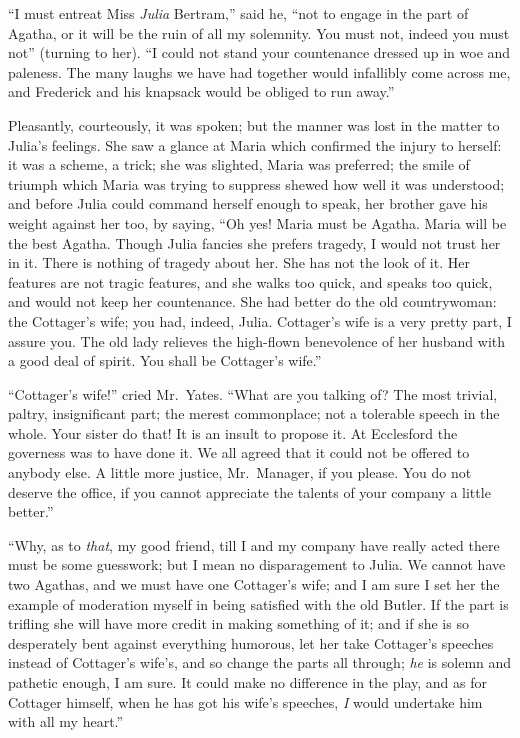 \documentclass{article}
\begin{document}
``I must entreat Miss \emph{Julia} Bertram,'' said he, ``not to
engage in the part of Agatha, or it will be the ruin
of all my solemnity.  You must not, indeed you must not''
(turning to her). ``I could not stand your countenance
dressed up in woe and paleness.  The many laughs we have
had together would infallibly come across me, and Frederick
and his knapsack would be obliged to run away.''

Pleasantly, courteously, it was spoken; but the
manner was lost in the matter to Julia's feelings.
She saw a glance at Maria which confirmed the injury
to herself:  it was a scheme, a trick; she was slighted,
Maria was preferred; the smile of triumph which Maria
was trying to suppress shewed how well it was understood;
and before Julia could command herself enough to speak,
her brother gave his weight against her too, by saying,
``Oh yes!  Maria must be Agatha.  Maria will be the
best Agatha.  Though Julia fancies she prefers tragedy,
I would not trust her in it.  There is nothing of tragedy
about her.  She has not the look of it.  Her features
are not tragic features, and she walks too quick,
and speaks too quick, and would not keep her countenance.
She had better do the old countrywoman:  the Cottager's wife;
you had, indeed, Julia.  Cottager's wife is a very pretty part,
I assure you.  The old lady relieves the high-flown
benevolence of her husband with a good deal of spirit.
You shall be Cottager's wife.''

``Cottager's wife!'' cried Mr.\ Yates.  ``What are you
talking of?  The most trivial, paltry, insignificant part;
the merest commonplace; not a tolerable speech in the whole.
Your sister do that!  It is an insult to propose it.
At Ecclesford the governess was to have done it.
We all agreed that it could not be offered to anybody else.
A little more justice, Mr.\ Manager, if you please.
You do not deserve the office, if you cannot appreciate
the talents of your company a little better.''

``Why, as to \emph{that}, my good friend, till I and my company
have really acted there must be some guesswork; but I mean
no disparagement to Julia.  We cannot have two Agathas,
and we must have one Cottager's wife; and I am sure I set
her the example of moderation myself in being satisfied
with the old Butler.  If the part is trifling she will
have more credit in making something of it; and if she
is so desperately bent against everything humorous,
let her take Cottager's speeches instead of Cottager's
wife's, and so change the parts all through; \emph{he} is
solemn and pathetic enough, I am sure.  It could make
no difference in the play, and as for Cottager himself,
when he has got his wife's speeches, \emph{I} would undertake
him with all my heart.''
\end{document}
